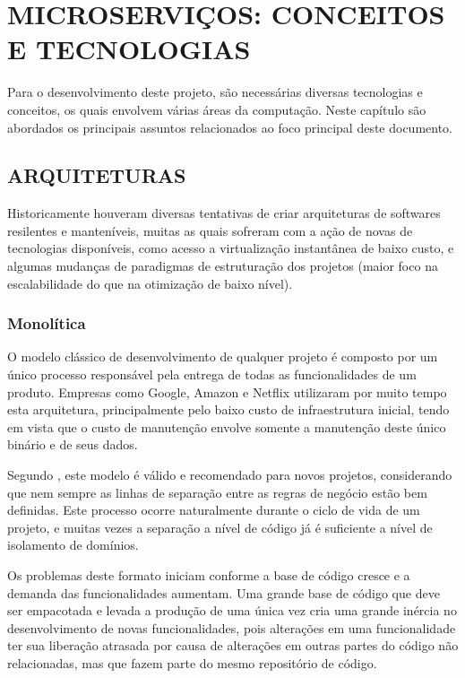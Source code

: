 \chapter{MICROSERVIÇOS: CONCEITOS E TECNOLOGIAS}
\label{chp:tecnologias}

Para o desenvolvimento deste projeto, são necessárias diversas tecnologias e
conceitos, os quais envolvem várias áreas da computação. Neste capítulo são
abordados os principais assuntos relacionados ao foco principal deste documento.

\section{ARQUITETURAS}

Historicamente houveram diversas tentativas de criar arquiteturas de softwares
resilentes e manteníveis, muitas as quais sofreram com a ação de novas de
tecnologias disponíveis, como acesso a virtualização instantânea de baixo custo,
e algumas mudanças de paradigmas de estruturação dos projetos (maior foco na
escalabilidade do que na otimização de baixo nível).

\subsection{Monolítica}

O modelo clássico de desenvolvimento de qualquer projeto é composto por um
único processo responsável pela entrega de todas as funcionalidades de um
produto. Empresas como Google, Amazon e Netflix utilizaram por muito tempo
esta arquitetura, principalmente pelo baixo custo de infraestrutura inicial,
tendo em vista que o custo de manutenção envolve somente a manutenção deste
único binário e de seus dados.

Segundo , este modelo é válido e recomendado para novos
projetos, considerando que nem sempre as linhas de separação entre as regras
de negócio estão bem definidas. Este processo ocorre naturalmente durante o
ciclo de vida de um projeto, e muitas vezes a separação a nível de código já
é suficiente a nível de isolamento de domínios.

Os problemas deste formato iniciam conforme a base de código cresce e a demanda
das funcionalidades aumentam. Uma grande base de código que deve ser empacotada
e levada a produção de uma única vez cria uma grande inércia no desenvolvimento
de novas funcionalidades, pois alterações em uma funcionalidade ter sua
liberação atrasada por causa de alterações em outras partes do código não
relacionadas, mas que fazem parte do mesmo repositório de código.

